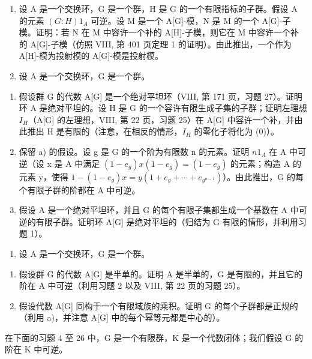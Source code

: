 
\begin{enumerate}
\def\labelenumi{\arabic{enumi})}
\item
  设 A 是一个交换环，G 是一个群，H 是 G 的一个有限指标的子群。假设 A 的元素 \((G:H)1_{A}\) 可逆。设 M 是一个 A{[}G{]}-模，N 是 M 的一个 A{[}G{]}-子模。证明：若 N 在 M 中容许一个补的 A{[}H{]}-子模，则它在 M 中容许一个补的 A{[}G{]}-子模（仿照 VIII, 第 401 页定理 1 的证明）。由此推出，一个作为 A{[}H{]}-模为投射模的 A{[}G{]}-模是投射模。
\item
  设 A 是一个交换环，G 是一个群。
\end{enumerate}

\begin{enumerate}
\def\labelenumi{\alph{enumi})}
\item
  假设群 G 的代数 A{[}G{]} 是一个绝对平坦环（VIII, 第 171 页，习题 27）。证明环 A 是绝对平坦的。设 H 是 G 的一个容许有限生成子集的子群；证明左理想 \(I_{H}\)（A{[}G{]} 的左理想，VIII, 第 22 页，习题 25）在 A{[}G{]} 中容许一个补，并由此推出 H 是有限的（注意，在相反的情形，\(I_{H}\) 的零化子将化为 (0)）。
\item
  保留 a) 的假设。设 g 是 G 的一个阶为有限数 n 的元素。证明 \(n1_{A}\) 在 A 中可逆（设 x 是 A 中满足 \((1-e_{g})x(1-e_{g})=(1-e_{g})\) 的元素；构造 A 的元素 y，使得 \(1-(1-e_{g})x=y(1+e_{g}+\cdots+e_{g^{n-1}})\)）。由此推出，G 的每个有限子群的阶都在 A 中可逆。
\item
  假设 A 是一个绝对平坦环，并且 G 的每个有限子集都生成一个基数在 A 中可逆的有限子群。证明环 A{[}G{]} 是绝对平坦的（归结为 G 有限的情形，并利用习题 1）。
\end{enumerate}

\begin{enumerate}
\def\labelenumi{\arabic{enumi})}
\setcounter{enumi}{2}
\tightlist
\item
  设 A 是一个交换环，G 是一个群。
\end{enumerate}

\begin{enumerate}
\def\labelenumi{\alph{enumi})}
\item
  假设群 G 的代数 A{[}G{]} 是半单的。证明 A 是半单的，G 是有限的，并且它的阶在 A 中可逆（利用习题 2 以及 VIII, 第 22 页的习题 25）。
\item
  假设代数 A{[}G{]} 同构于一个有限域族的乘积。证明 G 的每个子群都是正规的（利用 a)，并注意 A{[}G{]} 中的每个幂等元都是中心的）。
\end{enumerate}

在下面的习题 4 至 26 中，G 是一个有限群，K 是一个代数闭体；我们假设 G 的阶在 K 中可逆。

